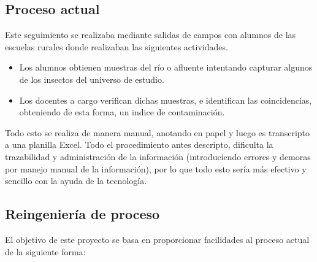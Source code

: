     \subsection{Proceso actual}

    Este seguimiento se realizaba mediante salidas de campos con alumnos de las escuelas rurales donde realizaban las siguientes actividades.
    \begin{itemize}
        \item Los alumnos obtienen muestras del río o afluente intentando capturar algunos de los insectos del universo de estudio.
        \item Los docentes a cargo verifican dichas muestras, e identifican las coincidencias, obteniendo de esta forma, un indice de contaminación.  
    \end{itemize}
    Todo esto se realiza de manera manual, anotando en papel y luego es transcripto a una planilla Excel.
    Todo el procedimiento antes descripto, dificulta la trazabilidad y administración de la información (introduciendo errores y demoras por manejo manual de la información), por lo que todo esto sería más efectivo y sencillo con la ayuda de la tecnología.

    \subsection{Reingeniería de proceso}

    El objetivo de este proyecto se basa en proporcionar facilidades al proceso actual de la siguiente forma: 

